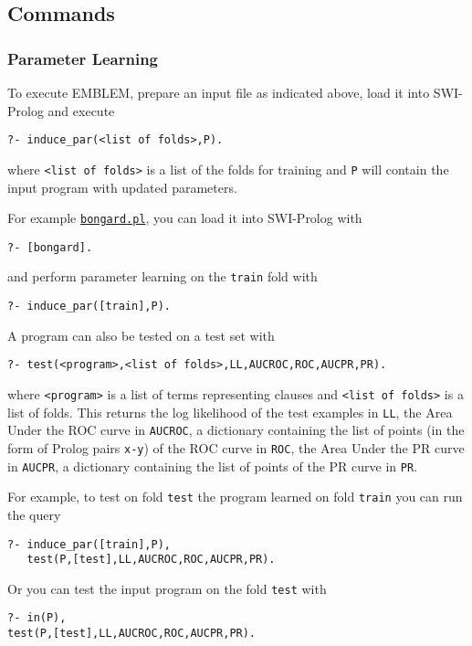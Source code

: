 \documentclass[a4paper,10pt]{scrartcl}
\begin{document}










\subsection{Commands}
\subsubsection{Parameter Learning}
To execute EMBLEM, prepare an input file as indicated above,
 load it into SWI-Prolog and execute
\begin{verbatim}
?- induce_par(<list of folds>,P).
\end{verbatim}
where \verb|<list of folds>| is a list of the folds for training and
\verb|P| will contain the input program with updated parameters.

For example \href{http://cplint.lamping.unife.it/example/learning/bongard.pl}{\texttt{bongard.pl}}, you can load it into SWI-Prolog
with
\begin{verbatim}
?- [bongard].
\end{verbatim}
and perform parameter learning on the \verb|train| fold with 
\begin{verbatim}
?- induce_par([train],P).
\end{verbatim}
A program can also be tested on a test set with
\begin{verbatim}
?- test(<program>,<list of folds>,LL,AUCROC,ROC,AUCPR,PR).
\end{verbatim}
where \verb|<program>| is a list of terms representing clauses and
\verb|<list of folds>| is a list of folds.
This returns the log likelihood of the test examples in \verb|LL|, the Area Under the ROC curve in \verb|AUCROC|, a dictionary containing the list of points (in the form of Prolog pairs \verb|x-y|) of the ROC curve in \verb|ROC|,
the Area Under the PR curve in \verb|AUCPR|, a dictionary containing the list of points of the PR curve in \verb|PR|.

For example, to test on fold \verb|test| the program learned on fold \verb|train| you can run the query
\begin{verbatim}
?- induce_par([train],P),
   test(P,[test],LL,AUCROC,ROC,AUCPR,PR).
\end{verbatim}
Or you can test the input program on the fold \verb|test| with
\begin{verbatim}
?- in(P),
test(P,[test],LL,AUCROC,ROC,AUCPR,PR).
\end{verbatim}
\end{document}
